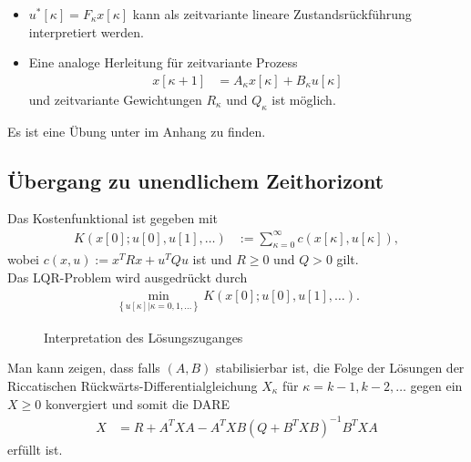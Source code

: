 \begin{remark}\hspace{1mm}
\begin{itemize}
  \item $u^{\ast}[\kappa]=F_{\kappa}x[\kappa]$ kann als zeitvariante lineare Zustandsrückführung interpretiert werden. 
  \item Eine analoge Herleitung für zeitvariante Prozess
  \begin{align*}
  	x[\kappa + 1] & = A_{\kappa}x[\kappa] + B_{\kappa}u[\kappa]
  \end{align*}
  und zeitvariante Gewichtungen $R_{\kappa}$ und $Q_{\kappa}$ ist möglich.
\end{itemize}
\end{remark}
Es ist eine Übung unter  im Anhang zu finden.

\subsection{Übergang zu unendlichem Zeithorizont}
Das Kostenfunktional ist gegeben mit
\begin{align}
	K\left(x[0];u[0],u[1],\ldots \right) & := \sum\limits_{\kappa=0}^{\infty}c\left(x[\kappa],u[\kappa] \right),
\end{align}
wobei $c(x,u):=x^TRx + u^TQu$ ist und $R\geq 0$ und $Q>0$ gilt.\\
Das \ac{LQR}-Problem wird ausgedrückt durch
\begin{align*}
	\min\limits_{\left\{u[\kappa]|\kappa=0,1,\ldots \right\}} K\left(x[0];u[0],u[1],\ldots \right).
\end{align*} 
\begin{figure}[htb]
	\centering
	
	\caption{Interpretation des Lösungszuganges}
	\label{fig:kap_3_loesungszugang}
\end{figure}
Man kann zeigen, dass falls $(A,B)$ stabilisierbar ist, die Folge der Lösungen der Riccatischen Rückwärts-Differentialgleichung $X_{\kappa}$ für $\kappa=k-1,k-2,\ldots$ gegen ein $X\geq
0$ konvergiert und somit die
\ac{DARE} 
\begin{align*}
	X & = R + A^TXA - A^TXB\left(Q + B^TXB \right)^{-1}B^TXA
\end{align*}
erfüllt ist. 

